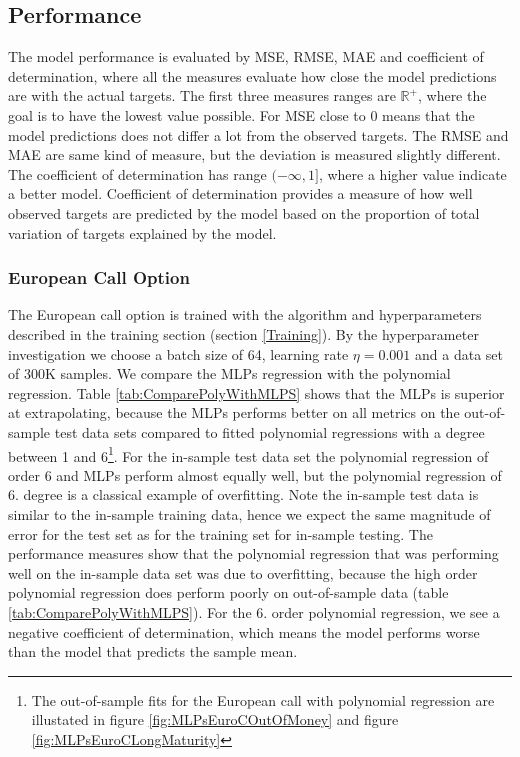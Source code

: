 \subsection{Performance}
The model performance is evaluated by MSE, RMSE, MAE and coefficient of determination, where all the measures evaluate how close the model predictions are with the actual targets. The first three measures ranges are $\mathbb{R}^+$, where the goal is to have the lowest value possible. For MSE close to 0 means that the model predictions does not differ a lot from the observed targets. The RMSE and MAE are same kind of measure, but the deviation is measured slightly different. The coefficient of determination has range $(-\infty, 1]$, where a higher value indicate a better model. Coefficient of determination provides a measure of how well observed targets are predicted by the model based on the proportion of total variation of targets explained by the model.

\subsubsection{European Call Option}
The European call option is trained with the algorithm and hyperparameters described in the training section (section \ref{Training}). By the hyperparameter investigation we choose a batch size of 64, learning rate $\eta = 0.001$ and a data set of 300K samples. We compare the MLPs regression with the polynomial regression. Table \ref{tab:ComparePolyWithMLPS} shows that the MLPs is superior at extrapolating, because the MLPs performs better on all metrics on the out-of-sample test data sets compared to fitted polynomial regressions with a degree between 1 and 6\footnote{The out-of-sample fits for the European call with polynomial regression are illustated in figure \ref{fig:MLPsEuroCOutOfMoney} and figure \ref{fig:MLPsEuroCLongMaturity}}. For the in-sample test data set the polynomial regression of order 6 and MLPs perform almost equally well, but the polynomial regression of 6. degree is a classical example of overfitting. Note the in-sample test data is similar to the in-sample training data, hence we expect the same magnitude of error for the test set as for the training set for in-sample testing. The performance measures show that the polynomial regression that was performing well on the in-sample data set was due to overfitting, because the high order polynomial regression does perform poorly on out-of-sample data (table \ref{tab:ComparePolyWithMLPS}). For the 6. order polynomial regression, we see a negative coefficient of determination, which means the model performs worse than the model that predicts the sample mean. \\

